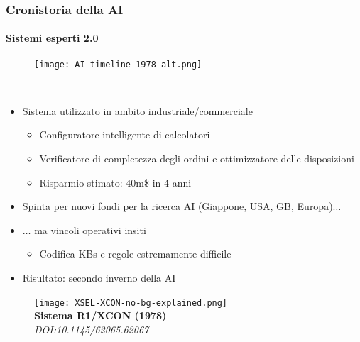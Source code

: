 %
\begin{frame}[t,fragile] \frametitle{Cronistoria della AI}
{\scriptsize
{}
\framesubtitle{Sistemi esperti 2.0}
\vspace*{-.5cm}
	\begin{minipage}[t]{\textwidth}
		\begin{figure}[ht]
			\centering
			\texttt{[image: AI-timeline-1978-alt.png]}
		\end{figure}
	\end{minipage}
	\\\vspace*{.3cm}
	\begin{minipage}[t]{\textwidth}
		\begin{minipage}[t]{0.6\textwidth}
			\begin{itemize}[leftmargin=10pt,align=right]
				\onslide<2->\item[\alert{\faArrowCircleRight}] Sistema utilizzato in ambito \alert{industriale/commerciale}
				\begin{itemize}[leftmargin=10pt,align=right]
					\onslide<3->\item[\alert{\faArrowCircleRight}] Configuratore intelligente di calcolatori
					\item[\alert{\faArrowCircleRight}] Verificatore di completezza degli ordini e ottimizzatore delle disposizioni
					\item[\alert{\faArrowCircleRight}] Risparmio stimato: 40m\$ in 4 anni
				\end{itemize}
				\item[\alert{\faArrowCircleRight}] Spinta per nuovi fondi per la ricerca AI (Giappone, USA, GB, Europa)$\ldots$
				\onslide<5->\item[\alert{\faArrowCircleRight}]$\ldots$ ma vincoli operativi insiti
				\begin{itemize}[leftmargin=10pt,align=right]
					\item[\alert{\faArrowCircleRight}] Codifica KBs e regole estremamente difficile
				\end{itemize}
				\item[\alert{\faArrowCircleRight}] Risultato: \alert{secondo inverno della AI}
			\end{itemize}
		\end{minipage}
		\begin{minipage}[t]{0.4\textwidth}
			\centering
			\begin{figure}[ht]
				\texttt{[image: XSEL-XCON-no-bg-explained.png]}
				{\tiny\\\textbf{Sistema R1/XCON (1978)}\\\textit{\textcopyright DOI:10.1145/62065.62067}}
			\end{figure}
		\end{minipage}
	\end{minipage}
}
\end{frame}
